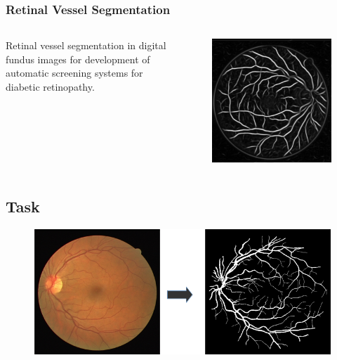 \documentclass{beamer}
\begin{document}
\begin{frame}
\frametitle{Retinal Vessel Segmentation}

\begin{columns}[c] %


Retinal vessel segmentation in digital fundus images for development of automatic screening systems for diabetic retinopathy.

\begin{figure}
\includegraphics[width=0.6\linewidth]{Images/slide1.png}
\end{figure}

\end{columns}



\end{frame}





\subsection{Task}
\begin{frame}
\begin{figure}
\includegraphics[width=1.0\linewidth]{Images/Graphic1.png}
\end{figure}
\end{frame}
\end{document}
